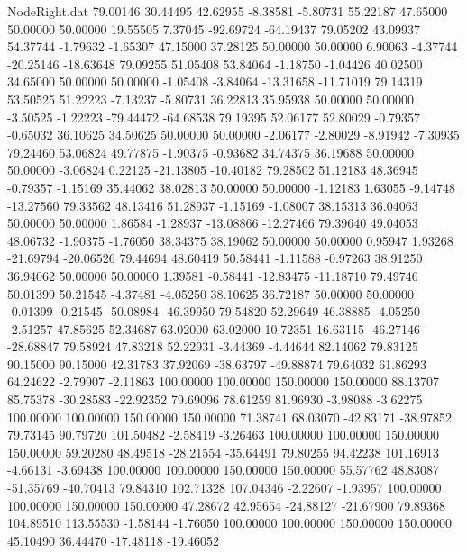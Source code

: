 \begin{filecontents}{NodeRight.dat}
  79.00146   30.44495   42.62955    -8.38581   -5.80731   55.22187   47.65000   50.00000   50.00000   19.55505    7.37045  -92.69724  -64.19437
  79.05202   43.09937   54.37744    -1.79632   -1.65307   47.15000   37.28125   50.00000   50.00000    6.90063   -4.37744  -20.25146  -18.63648
  79.09255   51.05408   53.84064    -1.18750   -1.04426   40.02500   34.65000   50.00000   50.00000   -1.05408   -3.84064  -13.31658  -11.71019
  79.14319   53.50525   51.22223    -7.13237   -5.80731   36.22813   35.95938   50.00000   50.00000   -3.50525   -1.22223  -79.44472  -64.68538
  79.19395   52.06177   52.80029    -0.79357   -0.65032   36.10625   34.50625   50.00000   50.00000   -2.06177   -2.80029   -8.91942   -7.30935
  79.24460   53.06824   49.77875    -1.90375   -0.93682   34.74375   36.19688   50.00000   50.00000   -3.06824    0.22125  -21.13805  -10.40182
  79.28502   51.12183   48.36945    -0.79357   -1.15169   35.44062   38.02813   50.00000   50.00000   -1.12183    1.63055   -9.14748  -13.27560
  79.33562   48.13416   51.28937    -1.15169   -1.08007   38.15313   36.04063   50.00000   50.00000    1.86584   -1.28937  -13.08866  -12.27466
  79.39640   49.04053   48.06732    -1.90375   -1.76050   38.34375   38.19062   50.00000   50.00000    0.95947    1.93268  -21.69794  -20.06526
  79.44694   48.60419   50.58441    -1.11588   -0.97263   38.91250   36.94062   50.00000   50.00000    1.39581   -0.58441  -12.83475  -11.18710
  79.49746   50.01399   50.21545    -4.37481   -4.05250   38.10625   36.72187   50.00000   50.00000   -0.01399   -0.21545  -50.08984  -46.39950
  79.54820   52.29649   46.38885    -4.05250   -2.51257   47.85625   52.34687   63.02000   63.02000   10.72351   16.63115  -46.27146  -28.68847
  79.58924   47.83218   52.22931    -3.44369   -4.44644   82.14062   79.83125   90.15000   90.15000   42.31783   37.92069  -38.63797  -49.88874
  79.64032   61.86293   64.24622    -2.79907   -2.11863  100.00000  100.00000  150.00000  150.00000   88.13707   85.75378  -30.28583  -22.92352
  79.69096   78.61259   81.96930    -3.98088   -3.62275  100.00000  100.00000  150.00000  150.00000   71.38741   68.03070  -42.83171  -38.97852
  79.73145   90.79720  101.50482    -2.58419   -3.26463  100.00000  100.00000  150.00000  150.00000   59.20280   48.49518  -28.21554  -35.64491
  79.80255   94.42238  101.16913    -4.66131   -3.69438  100.00000  100.00000  150.00000  150.00000   55.57762   48.83087  -51.35769  -40.70413
  79.84310  102.71328  107.04346    -2.22607   -1.93957  100.00000  100.00000  150.00000  150.00000   47.28672   42.95654  -24.88127  -21.67900
  79.89368  104.89510  113.55530    -1.58144   -1.76050  100.00000  100.00000  150.00000  150.00000   45.10490   36.44470  -17.48118  -19.46052

\end{filecontents}
